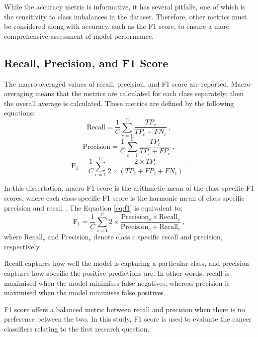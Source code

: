 \documentclass{l4proj}
\begin{document}
While the accuracy metric is informative, it has several pitfalls, one of which is the sensitivity to class imbalances in the dataset. Therefore, other metrics must be considered along with accuracy, such as the F1 score, to ensure a more comprehensive assessment of model performance.

\subsection{Recall, Precision, and F1 Score} \label{sec:F1-score}
The macro-averaged values of recall, precision, and F1 score are reported. Macro-averaging means that the metrics are calculated for each class separately; then the overall average is calculated. These metrics are defined by the following equations:
\begin{equation}
    \text{Recall} = \frac{1}{C}\sum_{c=1}^{C}\frac{TP_c}{TP_c + FN_c}\ ,
\end{equation}
\begin{equation}
    \text{Precision} = \frac{1}{C}\sum_{c=1}^{C}\frac{TP_c}{TP_c+FP_c}\ ,
\end{equation}
\begin{equation}\label{eq:f1}
    \text{F}_1 = \frac{1}{C}\sum_{c=1}^{C}\frac{2 \times TP_c}{2 \times (TP_c + FP_c + FN_c)}\ .
\end{equation}

In this dissertation, macro F1 score is the arithmetic mean of the class-specific F1 scores, where each class-specific F1 score is the harmonic mean of class-specific precision and recall \citep{opitz2021}. The Equation \ref{eq:f1} is equivalent to:
\begin{equation}
    \text{F}_1 = \frac{1}{C}\sum_{c=1}^{C}2 \times \frac{\text{Precision}_c \times \text{Recall}_c}{\text{Precision}_c + \text{Recall}_c}\ ,
\end{equation}
where Recall$_c$ and Precision$_c$ denote class $c$ specific recall and precision, respectively.

Recall captures how well the model is capturing a particular class, and precision captures how specific the positive predictions are. In other words, recall is maximised when the model minimises false negatives, whereas precision is maximised when the model minimises false positives.

F1 score offers a balanced metric between recall and precision when there is no preference between the two. In this study, F1 score is used to evaluate the cancer classifiers relating to the first research question.
\end{document}
